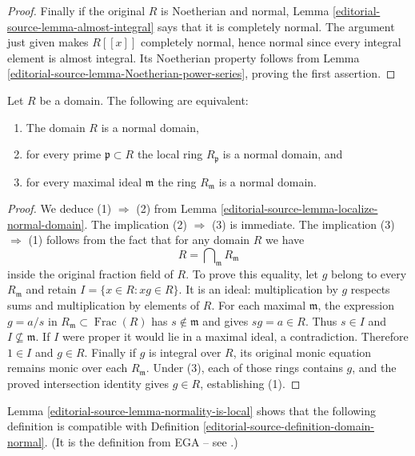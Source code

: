 \begin{proof}
Finally if the original $R$ is Noetherian and normal, Lemma
\ref{editorial-source-lemma-almost-integral} says that it is completely normal.
The argument just given makes $R[[x]]$ completely normal, hence
normal since every integral element is almost integral.
Its Noetherian property follows from
Lemma \ref{editorial-source-lemma-Noetherian-power-series}, proving the first assertion.
\end{proof}

\begin{lemma}
\label{editorial-source-lemma-normality-is-local}
Let $R$ be a domain. The following are equivalent:
\begin{enumerate}
\item The domain $R$ is a normal domain,
\item for every prime $\mathfrak p \subset R$ the local ring
$R_{\mathfrak p}$ is a normal domain, and
\item for every maximal ideal $\mathfrak m$ the ring $R_{\mathfrak m}$
is a normal domain.
\end{enumerate}
\end{lemma}

\begin{proof}
We deduce (1) $\Rightarrow$ (2) from Lemma \ref{editorial-source-lemma-localize-normal-domain}.
The implication (2) $\Rightarrow$ (3) is immediate. The implication
(3) $\Rightarrow$ (1) follows from the fact that for any domain $R$ we have
$$
R = \bigcap\nolimits_{\mathfrak m} R_{\mathfrak m}
$$
inside the original fraction field of $R$. To prove this equality,
let $g$ belong to every $R_{\mathfrak m}$ and retain
$I=\{x\in R:xg\in R\}$. It is an ideal: multiplication by
$g$ respects sums and multiplication by elements of $R$.
For each maximal $\mathfrak m$, the expression $g=a/s$ in
$R_{\mathfrak m}\subset\operatorname{Frac}(R)$ has
$s\notin\mathfrak m$ and gives $sg=a\in R$. Thus $s\in I$
and $I\not\subseteq\mathfrak m$. If $I$ were proper it would
lie in a maximal ideal, a contradiction. Therefore $1\in I$
and $g\in R$. Finally if $g$ is integral over $R$, its original
monic equation remains monic over each $R_{\mathfrak m}$.
Under (3), each of those rings contains $g$, and the proved
intersection identity gives $g\in R$, establishing (1).
\end{proof}

\noindent
Lemma \ref{editorial-source-lemma-normality-is-local} shows that the following definition
is compatible with Definition \ref{editorial-source-definition-domain-normal}. (It is the
definition from EGA -- see \cite[IV, 5.13.5 and 0, 4.1.4]{EGA}.)


